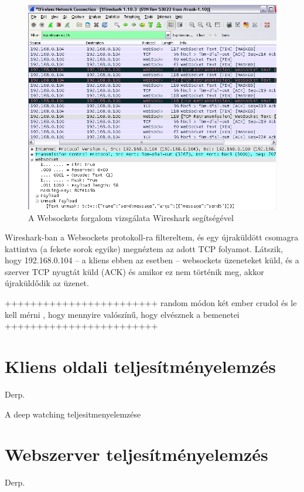 \begin{figure}[!ht]
\centering
\includegraphics[width=15cm,keepaspectratio]{figures/wireshark.png}
\caption{A Websockets forgalom vizsgálata Wireshark segítségével}
\label{fig:wireshark}
\end{figure}


Wireshark-ban a Websockets protokoll-ra filtereltem, és egy újraküldött csomagra kattintva (a fekete sorok egyike) megnéztem az adott TCP folyamot. Látszik, hogy 192.168.0.104 -- a kliens ebben az esetben -- websockets üzeneteket küld, és a szerver TCP nyugtát küld (ACK) és amikor ez nem történik meg, akkor újraküldődik az üzenet.



++++++++++++++++++++++++
random módon két ember crudol és le kell mérni , hogy mennyire valószínű, hogy elvésznek a bemenetei
++++++++++++++++++++++++

\section{Kliens oldali teljesítményelemzés}
Derp.

A deep watching teljesitmenyelemzése

\section{Webszerver teljesítményelemzés}
Derp.

